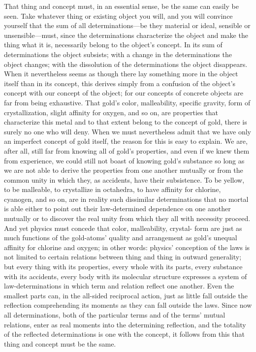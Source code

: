 \documentclass[12pt]{article}
\begin{document}
That thing and concept must, in an essential sense, be the same can easily
be seen. Take whatever thing or existing object you will, and you will
convince yourself that the sum of all determinations—be they material or
ideal, sensible or unsensible—must, since the determinations characterize
the object and make the thing what it is, necessarily belong to the object's
concept. In its sum of determinations the object subsists; with a change in
the determinations the object changes; with the dissolution of the
determinations the object disappears. When it nevertheless seems as though
there lay something more in the object itself than in its concept, this
derives simply from a confusion of the object's concept with our concept of
the object; for our concepts of concrete objects are far from being
exhaustive. That gold's color, malleability, specific gravity, form of
crystallization, slight affinity for oxygen, and so on, are properties that
characterize this metal and to that extent belong to the concept of gold,
there is surely no one who will deny. When we must nevertheless admit that
we have only an imperfect concept of gold itself, the reason for this is
easy to explain. We are, after all, still far from knowing all of gold's
properties, and even if we knew them from experience, we could still not
boast of knowing gold's substance so long as we are not able to derive the
properties from one another mutually or from the common unity in which they,
as accidents, have their subsistence. To be yellow, to be malleable, to
crystallize in octahedra, to have affinity for chlorine, cyanogen, and so
on, are in reality such dissimilar determinations that no mortal is able
either to point out their law-determined dependence on one another mutually
or to discover the real unity from which they all with necessity proceed.
And yet physics must concede that color, malleability, crystal-
form are just as much functions of the gold-atoms' quality and arrangement
as gold's unequal affinity for chlorine and oxygen; in other words: physics'
conception of the laws is not limited to certain relations between thing and
thing in outward generality; but every thing with its properties, every
whole with its parts, every substance with its accidents, every body with
its molecular structure expresses a system of law-determinations in which
term and relation reflect one another. Even the smallest parts can, in the
all-sided reciprocal action, just as little fall outside the reflection
comprehending its moments as they can fall outside the laws. Since now all
determinations, both of the particular terms and of the terms' mutual
relations, enter as real moments into the determining reflection, and the
totality of the reflected determinations is one with the concept, it follows
from this that thing and concept must be the same.
\end{document}
